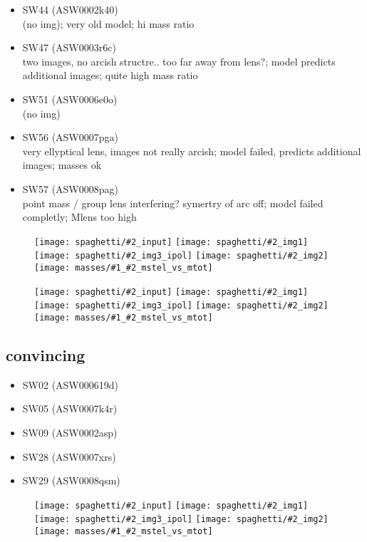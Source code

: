 \documentclass[fleqn,usenatbib]{mnras}
\newcommand{\inclfig}[2]{
  \centering
  \texttt{[image: spaghetti/\#2\_input]} %
  \texttt{[image: spaghetti/\#2\_img1]} \\
  \texttt{[image: spaghetti/\#2\_img3\_ipol]} %
  \texttt{[image: spaghetti/\#2\_img2]} \\
  \texttt{[image: masses/\#1\_\#2\_mstel\_vs\_mtot]}
}
\begin{document}
\begin{itemize}
  \item SW44 (ASW0002k40) \\
  (no img);
  very old model;
  hi mass ratio
  
  \item SW47 (ASW0003r6c) \\
  two images, no arcish structre.. too far away from lens?;
  model predicts additional images;
  quite high mass ratio
  
  \item SW51 (ASW0006e0o) \\
  (no img)
  
  \item SW56 (ASW0007pga) \\
  very ellyptical lens, images not really arcish;
  model failed, predicts additional images;
  masses ok
  
  \item SW57 (ASW0008pag) \\
  point mass / group lens interfering? symertry of arc off;
  model failed completly;
  Mlens too high
  
\end{itemize}


\begin{figure}
	\inclfig{SW19}{ASW0001ld7_OS3CYAKLRT}
\end{figure}


\begin{figure}
	\inclfig{SW57}{ASW0008pag_5SXGXQYY6V}
\end{figure}



\subsection{convincing}
\begin{itemize}
  \item SW02 (ASW000619d)
  
    
  \item SW05 (ASW0007k4r)
  
  \item SW09 (ASW0002asp)
  
  \item SW28 (ASW0007xrs)
  
  \item SW29 (ASW0008qsm)
  
\end{itemize}

\begin{figure}
	\inclfig{SW02}{ASW000619d_011489}
\end{figure}
\end{document}
